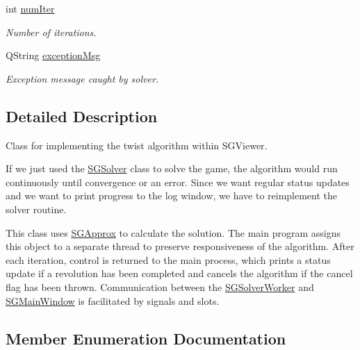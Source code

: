 \begin{DoxyCompactItemize}
int \hyperlink{classSGSolverWorker__V2_a6d19ed64fc70a400897d1667d41f1207}{num\+Iter}
\begin{DoxyCompactList}\small\item\em Number of iterations. \end{DoxyCompactList}\item 
\mbox{\label{classSGSolverWorker__V2_aa335ad02f05d42b9b99e254ec7803113}} 
Q\+String \hyperlink{classSGSolverWorker__V2_aa335ad02f05d42b9b99e254ec7803113}{exception\+Msg}
\begin{DoxyCompactList}\small\item\em Exception message caught by solver. \end{DoxyCompactList}\end{DoxyCompactItemize}


\subsection{Detailed Description}
Class for implementing the twist algorithm within S\+G\+Viewer. 

If we just used the \hyperlink{classSGSolver}{S\+G\+Solver} class to solve the game, the algorithm would run continuously until convergence or an error. Since we want regular status updates and we want to print progress to the log window, we have to reimplement the solver routine.

This class uses \hyperlink{classSGApprox}{S\+G\+Approx} to calculate the solution. The main program assigns this object to a separate thread to preserve responsiveness of the algorithm. After each iteration, control is returned to the main process, which prints a status update if a revolution has been completed and cancels the algorithm if the cancel flag has been thrown. Communication between the \hyperlink{classSGSolverWorker}{S\+G\+Solver\+Worker} and \hyperlink{classSGMainWindow}{S\+G\+Main\+Window} is facilitated by signals and slots. 

\subsection{Member Enumeration Documentation}
\mbox{\label{classSGSolverWorker__V2_a252099560187dceadfe97c1bd335c561}} 
